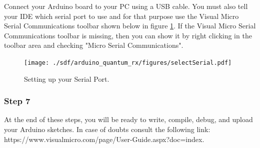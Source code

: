 \begin{refsection}
	Connect your Arduino board to your PC using a USB cable. You must also tell your IDE which serial port to use and for that purpose use the Visual Micro Serial Communications toolbar shown below in figure \ref{selectSerial}. If the Visual Micro Serial Communications toolbar is missing, then you can show it by right clicking in the toolbar area and checking "Micro Serial Communications".
	
	\begin{figure}[H]
		\centering
		\texttt{[image: ./sdf/arduino\_quantum\_rx/figures/selectSerial.pdf]}
		\caption{Setting up your Serial Port.} 
		\label{selectSerial}
	\end{figure}
	
	\subsubsection{Step 7}
	At the end of these steps, you will be ready to write, compile, debug, and upload your Arduino sketches. In case of doubts consult the following link: https://www.visualmicro.com/page/User-Guide.aspx?doc=index.
	
	
	
	
	
	\clearpage
	\printbibliography[heading=subbibliography]
\end{refsection}
\cleardoublepage
